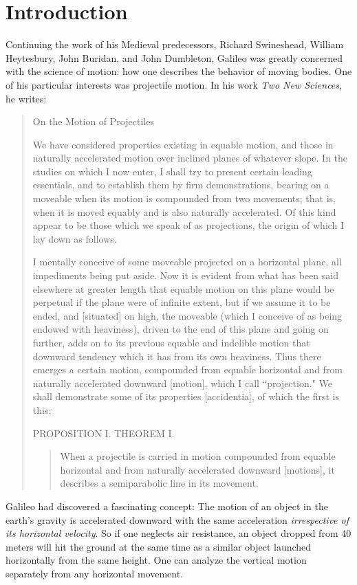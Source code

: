 \section*{Introduction}
     Continuing the work of his Medieval predecessors, Richard Swineshead,
William Heytesbury, John Buridan, and John Dumbleton, Galileo was greatly
concerned with the science of motion: how one describes the behavior
of
moving bodies.  One of his particular interests was
projectile
motion. In his work {\em Two New Sciences}, he writes:
\begin{quote}
\begin{center}
On the Motion of Projectiles
\end{center}
We have considered properties existing in equable motion, and those in
naturally accelerated motion over inclined planes of whatever slope.  In
the studies on which I now enter, I shall try to present certain leading
essentials, and to establish them by firm demonstrations, bearing on a
moveable when its motion is compounded from two movements; that is, when it
is moved equably and is also naturally accelerated.  Of this kind appear to
be those which we speak of as projections, the origin of which I lay down
as follows.

I mentally conceive of some moveable projected on a horizontal plane, all
impediments being put aside.  Now it is evident from what has been said
elsewhere at greater length that equable motion on this plane would be
perpetual if the plane were of infinite extent, but if we assume it to be
ended, and [situated] on high, the moveable (which I conceive of as being
endowed with heaviness), driven to the end of this plane and going on
further, adds on to its previous equable and indelible motion that downward
tendency which it has from its own heaviness.  Thus there emerges a certain
motion, compounded from equable horizontal and from naturally accelerated
downward [motion], which I call ``projection."  We shall demonstrate some of
its properties [accidentia], of which the first is this:
\begin{center}
PROPOSITION I.  THEOREM I.
\end{center}
\begin{quote}
When a projectile is carried in motion compounded from equable horizontal
and from naturally accelerated downward [motions], it describes a
semiparabolic line in its movement.
\end{quote}
\end{quote}

Galileo had discovered a fascinating concept: The motion of
an object in the earth's gravity is accelerated downward with the same
acceleration {\em irrespective of its horizontal velocity}.
So if one neglects air resistance, an object dropped from 40 meters will
hit the ground at the same time
as a similar object launched horizontally from the same height.  One
can analyze the vertical motion separately from any horizontal
movement.

